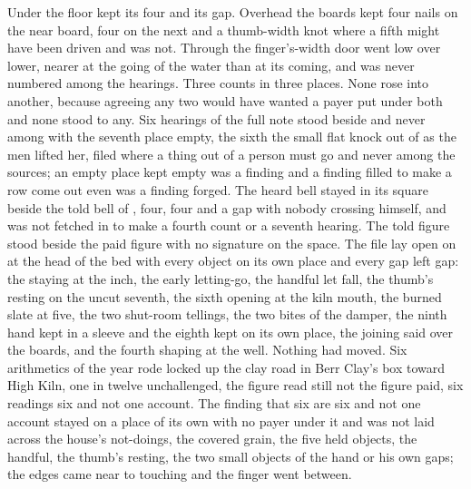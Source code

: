 Under the floor  kept its four and its gap. Overhead the boards kept four nails on the near board, four on the next and a thumb-width knot where a fifth might have been driven and was not. Through the finger's-width door  went low over lower, nearer at the going of the water than at its coming, and was never numbered among the hearings. Three counts in three places. None rose into another, because agreeing any two would have wanted a payer put under both and none stood to any. Six hearings of the full note stood beside and never among with the seventh place empty, the sixth the small flat knock out of  as the men lifted her, filed where a thing out of a person must go and never among the sources; an empty place kept empty was a finding and a finding filled to make a row come out even was a finding forged. The heard bell stayed in its square beside the told bell of , four, four and a gap with nobody crossing himself, and was not fetched in to make a fourth count or a seventh hearing. The told figure stood beside the paid figure with no signature on the space. The file lay open on  at the head of the bed with every object on its own place and every gap left gap: the staying at the inch, the early letting-go, the handful let fall, the thumb's resting on the uncut seventh, the sixth opening at the kiln mouth, the burned slate at five, the two shut-room tellings, the two bites of the damper, the ninth hand kept in a sleeve and the eighth kept on its own place, the joining said over the boards, and the fourth shaping at the well. Nothing had moved. Six arithmetics of the year rode locked up the clay road in Berr Clay's box toward High Kiln, one in twelve unchallenged, the figure read still not the figure paid, six readings six and not one account. The finding that six are six and not one account stayed on a place of its own with no payer under it and was not laid across the house's not-doings, the covered grain, the five held objects, the handful, the thumb's resting, the two small objects of the hand or his own gaps; the edges came near to touching and the finger went between.

